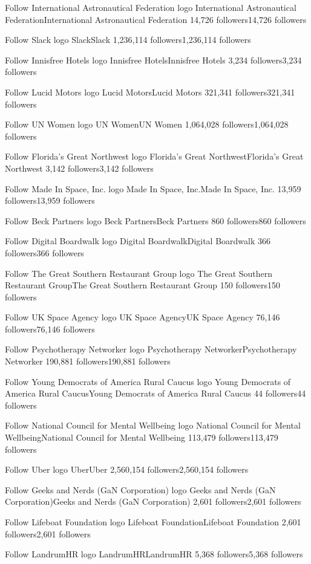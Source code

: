 Follow
International Astronautical Federation logo
International Astronautical FederationInternational Astronautical Federation
14,726 followers14,726 followers

Follow
Slack logo
SlackSlack
1,236,114 followers1,236,114 followers

Follow
Innisfree Hotels logo
Innisfree HotelsInnisfree Hotels
3,234 followers3,234 followers

Follow
Lucid Motors logo
Lucid MotorsLucid Motors
321,341 followers321,341 followers

Follow
UN Women logo
UN WomenUN Women
1,064,028 followers1,064,028 followers

Follow
Florida's Great Northwest logo
Florida's Great NorthwestFlorida's Great Northwest
3,142 followers3,142 followers

Follow
Made In Space, Inc. logo
Made In Space, Inc.Made In Space, Inc.
13,959 followers13,959 followers

Follow
Beck Partners logo
Beck PartnersBeck Partners
860 followers860 followers

Follow
Digital Boardwalk logo
Digital BoardwalkDigital Boardwalk
366 followers366 followers

Follow
The Great Southern Restaurant Group logo
The Great Southern Restaurant GroupThe Great Southern Restaurant Group
150 followers150 followers

Follow
UK Space Agency logo
UK Space AgencyUK Space Agency
76,146 followers76,146 followers

Follow
Psychotherapy Networker logo
Psychotherapy NetworkerPsychotherapy Networker
190,881 followers190,881 followers

Follow
Young Democrats of America Rural Caucus logo
Young Democrats of America Rural CaucusYoung Democrats of America Rural Caucus
44 followers44 followers

Follow
National Council for Mental Wellbeing logo
National Council for Mental WellbeingNational Council for Mental Wellbeing
113,479 followers113,479 followers

Follow
Uber logo
UberUber
2,560,154 followers2,560,154 followers

Follow
Geeks and Nerds (GaN Corporation) logo
Geeks and Nerds (GaN Corporation)Geeks and Nerds (GaN Corporation)
2,601 followers2,601 followers

Follow
Lifeboat Foundation logo
Lifeboat FoundationLifeboat Foundation
2,601 followers2,601 followers

Follow
LandrumHR logo
LandrumHRLandrumHR
5,368 followers5,368 followers

